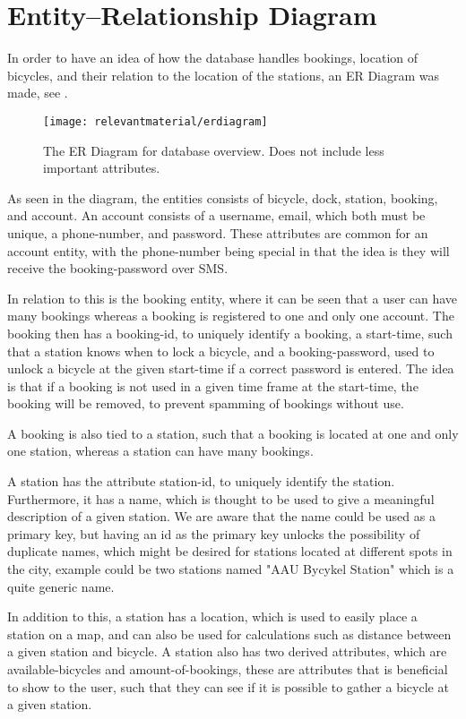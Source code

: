 \section{Entity--Relationship Diagram}\label{sec:ERdiagram}
In order to have an idea of how the database handles bookings, location of bicycles, and their relation to the location of the stations, an ER Diagram was made, see .

\begin{figure}
	\centering
	\texttt{[image: relevantmaterial/erdiagram]}
	\caption{The ER Diagram for database overview. Does not include less important attributes.}\label{fig:er-dia}
\end{figure}

As seen in the diagram, the entities consists of bicycle, dock, station, booking, and account.
An account consists of a username, email, which both must be unique, a phone-number, and password.
These attributes are common for an account entity, with the phone-number being special in that the idea is they will receive the booking-password over SMS.

In relation to this is the booking entity, where it can be seen that a user can have many bookings whereas a booking is registered to one and only one account.
The booking then has a booking-id, to uniquely identify a booking, a start-time, such that a station knows when to lock a bicycle, and a booking-password, used to unlock a bicycle at the given start-time if a correct password is entered.
The idea is that if a booking is not used in a given time frame at the start-time, the booking will be removed, to prevent spamming of bookings without use.

A booking is also tied to a station, such that a booking is located at one and only one station, whereas a station can have many bookings.

A station has the attribute station-id, to uniquely identify the station.
Furthermore, it has a name, which is thought to be used to give a meaningful description of a given station.
We are aware that the name could be used as a primary key, but having an id as the primary key unlocks the possibility of duplicate names, which might be desired for stations located at different spots in the city, example could be two stations named "AAU Bycykel Station" which is a quite generic name.

In addition to this, a station has a location, which is used to easily place a station on a map, and can also be used for calculations such as distance between a given station and bicycle.
A station also has two derived attributes, which are available-bicycles and amount-of-bookings, these are attributes that is beneficial to show to the user, such that they can see if it is possible to gather a bicycle at a given station.

